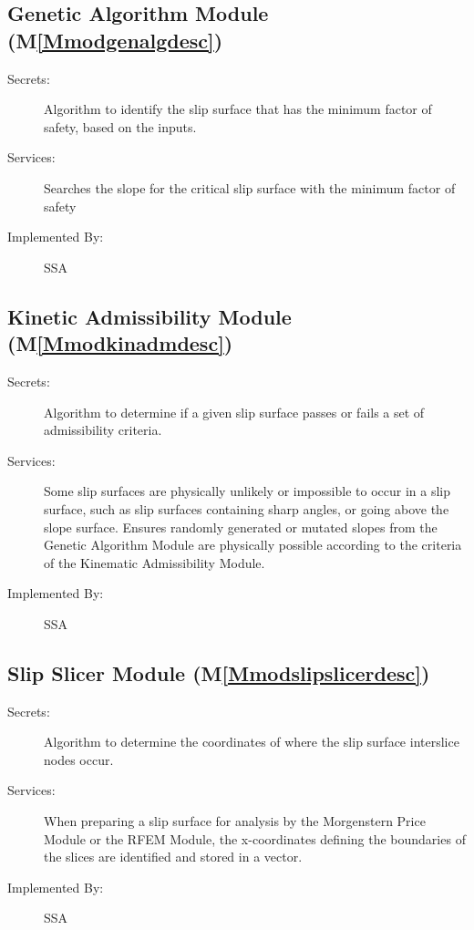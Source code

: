 \documentclass[12pt]{article}
\begin{document}
\subsection{Genetic Algorithm Module (M\ref{Mmodgenalgdesc})}
\label{Sec:GeneAlgoModu()}
\begin{description}
\item[Secrets:]Algorithm to identify the slip surface that has the minimum factor of safety, based on the inputs.
\item[Services:]Searches the slope for the critical slip surface with the minimum factor of safety
\item[Implemented By:]SSA
\end{description}
\subsection{Kinetic Admissibility Module (M\ref{Mmodkinadmdesc})}
\label{Sec:KineAdmiModu()}
\begin{description}
\item[Secrets:]Algorithm to determine if a given slip surface passes or fails a set of admissibility criteria.
\item[Services:]Some slip surfaces are physically unlikely or impossible to occur in a slip surface, such as slip surfaces containing sharp angles, or going above the slope surface. Ensures randomly generated or mutated slopes from the Genetic Algorithm Module are physically possible according to the criteria of the Kinematic Admissibility Module.
\item[Implemented By:]SSA
\end{description}
\subsection{Slip Slicer Module (M\ref{Mmodslipslicerdesc})}
\label{Sec:SlipSlicModu()}
\begin{description}
\item[Secrets:]Algorithm to determine the coordinates of where the slip surface interslice nodes occur.
\item[Services:]When preparing a slip surface for analysis by the Morgenstern Price Module or the RFEM Module, the x-coordinates defining the boundaries of the slices are identified and stored in a vector.
\item[Implemented By:]SSA
\end{description}
\end{document}
